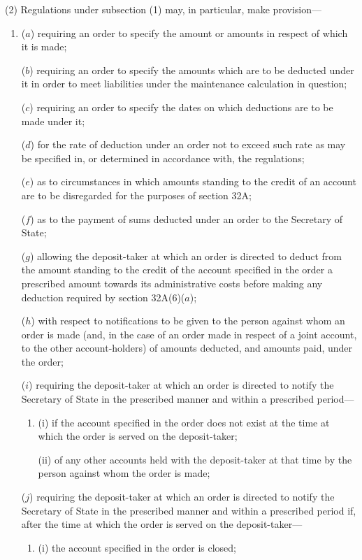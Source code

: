 \documentclass[a4paper]{article}
\begin{document}
(2) Regulations under subsection (1) may, in particular, make provision---
\begin{enumerate}\item[]
($a$) requiring an order to specify the amount or amounts in respect of which it is made;

($b$) requiring an order to specify the amounts which are to be deducted under it
in order to meet liabilities under the maintenance calculation in question;

($c$) requiring an order to specify the dates on which deductions are to be made
under it;

($d$) for the rate of deduction under an order not to exceed such rate as may be
specified in, or determined in accordance with, the regulations;

($e$) as to circumstances in which amounts standing to the credit of an account
are to be disregarded for the purposes of section 32A;

($f$) as to the payment of sums deducted under an order to the Secretary of
State;

($g$) allowing the deposit-taker at which an order is directed to deduct from the
amount standing to the credit of the account specified in the order a prescribed
amount towards its administrative costs before making any deduction required
by section 32A(6)($a$);

($h$) with respect to notifications to be given to the person against whom an order
is made (and, in the case of an order made in respect of a joint account, to the
other account-holders) of amounts deducted, and amounts paid, under the
order;

($i$) requiring the deposit-taker at which an order is directed to notify the
Secretary of State in the prescribed manner and within a prescribed period---
\begin{enumerate}\item[]
(i)
if the account specified in the order does not exist at the time at which
the order is served on the deposit-taker;

(ii)
of any other accounts held with the deposit-taker at that time by the
person against whom the order is made;
\end{enumerate}

($j$) requiring the deposit-taker at which an order is directed to notify the
Secretary of State in the prescribed manner and within a prescribed period
if, after the time at which the order is served on the deposit-taker---
\begin{enumerate}\item[]
(i) the account specified in the order is closed;


\end{enumerate}
\end{enumerate}
\end{document}
